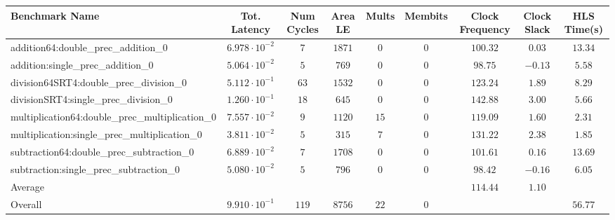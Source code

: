 \begin{tabular}{|l|c|c|c|c|c|c|c|c|}
\hline
Benchmark Name                                   & Tot. Latency            & Num Cycles & Area LE  & Mults  & Membits & Clock Frequency & Clock Slack & HLS Time(s) \\
\hline
addition64:double\_prec\_addition\_0             & $ 6.978 \cdot 10^{-2} $ & $ 7      $ & $ 1871 $ & $ 0  $ & $ 0   $ & $ 100.32      $ & $ 0.03    $ & $ 13.34   $ \\
addition:single\_prec\_addition\_0               & $ 5.064 \cdot 10^{-2} $ & $ 5      $ & $ 769  $ & $ 0  $ & $ 0   $ & $ 98.75       $ & $ -0.13   $ & $ 5.58    $ \\
division64SRT4:double\_prec\_division\_0         & $ 5.112 \cdot 10^{-1} $ & $ 63     $ & $ 1532 $ & $ 0  $ & $ 0   $ & $ 123.24      $ & $ 1.89    $ & $ 8.29    $ \\
divisionSRT4:single\_prec\_division\_0           & $ 1.260 \cdot 10^{-1} $ & $ 18     $ & $ 645  $ & $ 0  $ & $ 0   $ & $ 142.88      $ & $ 3.00    $ & $ 5.66    $ \\
multiplication64:double\_prec\_multiplication\_0 & $ 7.557 \cdot 10^{-2} $ & $ 9      $ & $ 1120 $ & $ 15 $ & $ 0   $ & $ 119.09      $ & $ 1.60    $ & $ 2.31    $ \\
multiplication:single\_prec\_multiplication\_0   & $ 3.811 \cdot 10^{-2} $ & $ 5      $ & $ 315  $ & $ 7  $ & $ 0   $ & $ 131.22      $ & $ 2.38    $ & $ 1.85    $ \\
subtraction64:double\_prec\_subtraction\_0       & $ 6.889 \cdot 10^{-2} $ & $ 7      $ & $ 1708 $ & $ 0  $ & $ 0   $ & $ 101.61      $ & $ 0.16    $ & $ 13.69   $ \\
subtraction:single\_prec\_subtraction\_0         & $ 5.080 \cdot 10^{-2} $ & $ 5      $ & $ 796  $ & $ 0  $ & $ 0   $ & $ 98.42       $ & $ -0.16   $ & $ 6.05    $ \\
\hline
Average                                          & $                     $ & $        $ & $      $ & $    $ & $     $ & $ 114.44      $ & $ 1.10    $ & $         $ \\
\hline
Overall                                          & $ 9.910 \cdot 10^{-1} $ & $ 119    $ & $ 8756 $ & $ 22 $ & $ 0   $ & $             $ & $         $ & $ 56.77   $ \\
\hline
\end{tabular}
